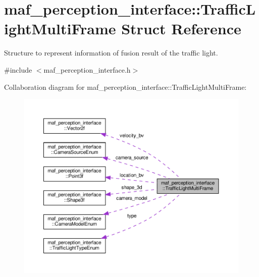 \hypertarget{structmaf__perception__interface_1_1TrafficLightMultiFrame}{}\section{maf\+\_\+perception\+\_\+interface\+:\+:Traffic\+Light\+Multi\+Frame Struct Reference}
\label{structmaf__perception__interface_1_1TrafficLightMultiFrame}


Structure to represent information of fusion result of the traffic light.  




{\ttfamily \#include $<$maf\+\_\+perception\+\_\+interface.\+h$>$}



Collaboration diagram for maf\+\_\+perception\+\_\+interface\+:\+:Traffic\+Light\+Multi\+Frame\+:\nopagebreak
\begin{figure}[H]
\begin{center}
\leavevmode
\includegraphics[width=350pt]{structmaf__perception__interface_1_1TrafficLightMultiFrame__coll__graph}
\end{center}
\end{figure}
